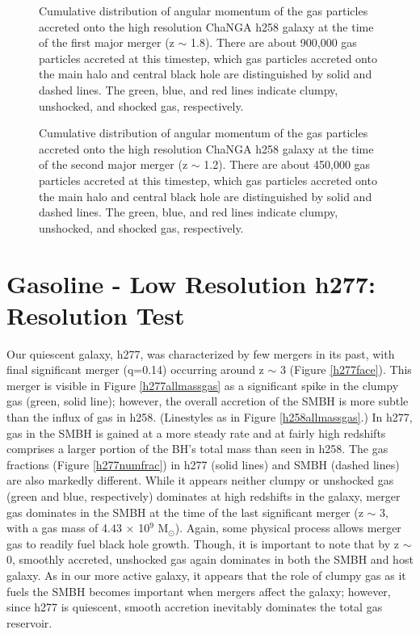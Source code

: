 \documentclass[12pt,headA,chapB]{fiskthesis}
\begin{document}
\begin{figure}
\centerline{}
\caption[ChaNGa h258 First Merger Angular Momentum Distribution]{ Cumulative distribution of angular momentum of the gas particles accreted onto the high resolution ChaNGA h258 galaxy at the time of the first major merger (z $\sim$ 1.8). There are about 900,000 gas particles accreted at this timestep, which gas particles accreted onto the main halo and central black hole are distinguished by solid and dashed lines. The green, blue, and red lines indicate clumpy, unshocked, and shocked gas, respectively.}
\label{hrh258angmom_merger1} 

\centerline{}
\caption[ChaNGa h258 Second Merger Angular Momentum Distribution]{ Cumulative distribution of angular momentum of the gas particles accreted onto the high resolution ChaNGA h258 galaxy at the time of the second major merger (z $\sim$ 1.2). There are about 450,000 gas particles accreted at this timestep, which gas particles accreted onto the main halo and central black hole are distinguished by solid and dashed lines. The green, blue, and red lines indicate clumpy, unshocked, and shocked gas, respectively.}
\label{hrh258angmom_merger2} 
\end{figure}


\section{Gasoline - Low Resolution h277: Resolution Test}
	
Our quiescent galaxy, h277, was characterized by few mergers in its past, with final significant merger (q=0.14) occurring around z $\sim$ 3 (Figure \ref{h277face}). This merger is visible in Figure \ref{h277allmassgas} as a significant spike in the clumpy gas (green, solid line); however, the overall accretion of the SMBH is more subtle than the influx of gas in h258. (Linestyles as in Figure \ref{h258allmassgas}.) In h277, gas in the SMBH is gained at a more steady rate and at fairly high redshifts comprises a larger portion of the BH's total mass than seen in h258. The gas fractions (Figure \ref{h277numfrac}) in h277 (solid lines) and SMBH (dashed lines) are also markedly different. While it appears neither clumpy or unshocked gas (green and blue, respectively) dominates at high redshifts in the galaxy, merger gas dominates in the SMBH at the time of the last significant merger (z $\sim$ 3, with a gas mass of 4.43 $\times$ 10$^9$ M$_{\odot}$). Again, some physical process allows merger gas to readily fuel black hole growth. Though, it is important to note that by z $\sim$ 0, smoothly accreted, unshocked gas again dominates in both the SMBH and host galaxy. As in our more active galaxy, it appears that the role of clumpy gas as it fuels the SMBH becomes important when mergers affect the galaxy; however, since h277 is quiescent, smooth accretion inevitably dominates the total gas reservoir.
\end{document}
